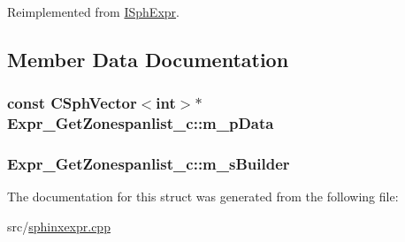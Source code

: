 Reimplemented from \hyperlink{structISphExpr_a5e1268916a46b2b9cabb93d30ca5c40c}{I\-Sph\-Expr}.



\subsection{Member Data Documentation}
\hypertarget{structExpr__GetZonespanlist__c_aa949b7efa15a5b2d01ca290631a6f6bf}{
\subsubsection[{m\-\_\-p\-Data}]{\setlength{\rightskip}{0pt plus 5cm}const {\bf C\-Sph\-Vector}$<${\bf int}$>$$\ast$ Expr\-\_\-\-Get\-Zonespanlist\-\_\-c\-::m\-\_\-p\-Data}}\label{structExpr__GetZonespanlist__c_aa949b7efa15a5b2d01ca290631a6f6bf}
\hypertarget{structExpr__GetZonespanlist__c_a78f9671aada0e68b594c50a92f70318f}{
\subsubsection[{m\-\_\-s\-Builder}]{ Expr\-\_\-\-Get\-Zonespanlist\-\_\-c\-::m\-\_\-s\-Builder\hspace{0.3cm}{\ttfamily [mutable]}}}\label{structExpr__GetZonespanlist__c_a78f9671aada0e68b594c50a92f70318f}


The documentation for this struct was generated from the following file\-:\begin{DoxyCompactItemize}
\item 
src/\hyperlink{sphinxexpr_8cpp}{sphinxexpr.\-cpp}\end{DoxyCompactItemize}
